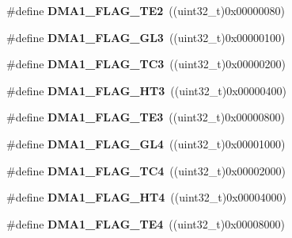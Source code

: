 \begin{DoxyCompactItemize}
\item 
\hypertarget{group__DMA__flags__definition_ga23bfb917d32a8dd5a96d343ef5f6ea46}{
\#define {\bfseries DMA1\_\-FLAG\_\-TE2}~((uint32\_\-t)0x00000080)}
\label{group__DMA__flags__definition_ga23bfb917d32a8dd5a96d343ef5f6ea46}

\item 
\hypertarget{group__DMA__flags__definition_gaf3eccffb15e5b64611774b22f8b43e91}{
\#define {\bfseries DMA1\_\-FLAG\_\-GL3}~((uint32\_\-t)0x00000100)}
\label{group__DMA__flags__definition_gaf3eccffb15e5b64611774b22f8b43e91}

\item 
\hypertarget{group__DMA__flags__definition_ga0490d6c6fca12f4bcc61ef69e3fbdd93}{
\#define {\bfseries DMA1\_\-FLAG\_\-TC3}~((uint32\_\-t)0x00000200)}
\label{group__DMA__flags__definition_ga0490d6c6fca12f4bcc61ef69e3fbdd93}

\item 
\hypertarget{group__DMA__flags__definition_ga9c801c1702fcc41b74bb7397ce80a8fc}{
\#define {\bfseries DMA1\_\-FLAG\_\-HT3}~((uint32\_\-t)0x00000400)}
\label{group__DMA__flags__definition_ga9c801c1702fcc41b74bb7397ce80a8fc}

\item 
\hypertarget{group__DMA__flags__definition_gaa0b3d86f09829d0388273f0cd51698cc}{
\#define {\bfseries DMA1\_\-FLAG\_\-TE3}~((uint32\_\-t)0x00000800)}
\label{group__DMA__flags__definition_gaa0b3d86f09829d0388273f0cd51698cc}

\item 
\hypertarget{group__DMA__flags__definition_gace751c9c8aa57b154d61865625cca25b}{
\#define {\bfseries DMA1\_\-FLAG\_\-GL4}~((uint32\_\-t)0x00001000)}
\label{group__DMA__flags__definition_gace751c9c8aa57b154d61865625cca25b}

\item 
\hypertarget{group__DMA__flags__definition_ga78f2798eca161493d5dc6058f65b0f17}{
\#define {\bfseries DMA1\_\-FLAG\_\-TC4}~((uint32\_\-t)0x00002000)}
\label{group__DMA__flags__definition_ga78f2798eca161493d5dc6058f65b0f17}

\item 
\hypertarget{group__DMA__flags__definition_ga12ad5a2c8cd9778fecf88d1dab7626d4}{
\#define {\bfseries DMA1\_\-FLAG\_\-HT4}~((uint32\_\-t)0x00004000)}
\label{group__DMA__flags__definition_ga12ad5a2c8cd9778fecf88d1dab7626d4}

\item 
\hypertarget{group__DMA__flags__definition_ga53beafec27ed89735e83fc7577a00d39}{
\#define {\bfseries DMA1\_\-FLAG\_\-TE4}~((uint32\_\-t)0x00008000)}
\label{group__DMA__flags__definition_ga53beafec27ed89735e83fc7577a00d39}


\end{DoxyCompactItemize}
